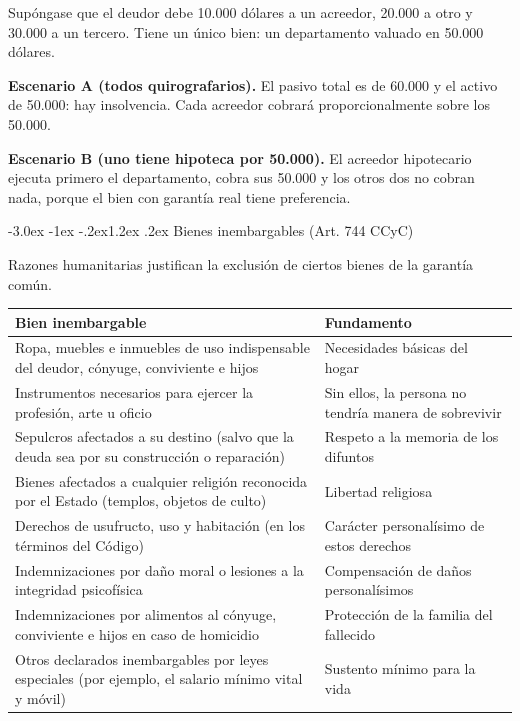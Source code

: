 \documentclass[12pt,oneside]{book}
\makeatletter
\renewcommand\section{\@startsection{section}{1}{\z@}%
  {-3.0ex \@plus -1ex \@minus -.2ex}{1.2ex \@plus .2ex}%
  {\normalfont\large\bfseries\color{acento}}}
\newenvironment{tabla}{%
    \par\medskip\begingroup\small\renewcommand{\arraystretch}{1.3}\noindent\ignorespaces
}{%
    \par\endgroup\medskip
}
\makeatother
\begin{document}
\begin{ejemplo}
Supóngase que el deudor debe 10.000 dólares a un acreedor, 20.000 a otro y 30.000 a un tercero. Tiene un único bien: un departamento valuado en 50.000 dólares.

\textbf{Escenario A (todos quirografarios).} El pasivo total es de 60.000 y el activo de 50.000: hay insolvencia. Cada acreedor cobrará proporcionalmente sobre los 50.000.

\textbf{Escenario B (uno tiene hipoteca por 50.000).} El acreedor hipotecario ejecuta primero el departamento, cobra sus 50.000 y los otros dos no cobran nada, porque el bien con garantía real tiene preferencia.
\end{ejemplo}

\section{Bienes inembargables (Art. 744 CCyC)}

Razones humanitarias justifican la exclusión de ciertos bienes de la garantía común.

\begin{tabla}
\begin{tabularx}{\textwidth}{P{8.4cm}Y}
\toprule
\textbf{Bien inembargable} & \textbf{Fundamento} \\
\midrule
Ropa, muebles e inmuebles de uso indispensable del deudor, cónyuge, conviviente e hijos & Necesidades básicas del hogar \\
Instrumentos necesarios para ejercer la profesión, arte u oficio & Sin ellos, la persona no tendría manera de sobrevivir \\
Sepulcros afectados a su destino (salvo que la deuda sea por su construcción o reparación) & Respeto a la memoria de los difuntos \\
Bienes afectados a cualquier religión reconocida por el Estado (templos, objetos de culto) & Libertad religiosa \\
Derechos de usufructo, uso y habitación (en los términos del Código) & Carácter personalísimo de estos derechos \\
Indemnizaciones por daño moral o lesiones a la integridad psicofísica & Compensación de daños personalísimos \\
Indemnizaciones por alimentos al cónyuge, conviviente e hijos en caso de homicidio & Protección de la familia del fallecido \\
Otros declarados inembargables por leyes especiales (por ejemplo, el salario mínimo vital y móvil) & Sustento mínimo para la vida \\
\bottomrule
\end{tabularx}
\end{tabla}
\end{document}
